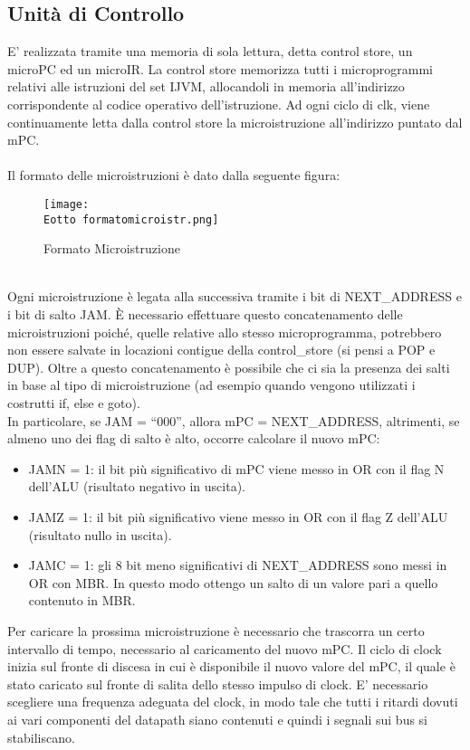 \documentclass[12pt]{article}
\def \Eotto {Allegati/Esercizio8/}
\begin{document}
\subsection{Unità di Controllo}
E’ realizzata tramite una memoria di sola lettura, detta control store, un microPC ed un microIR. La control store memorizza tutti i microprogrammi relativi alle istruzioni del set IJVM, allocandoli in memoria all’indirizzo corrispondente al codice operativo dell’istruzione.
Ad ogni ciclo di clk, viene continuamente letta dalla control store la microistruzione all’indirizzo puntato dal mPC.
\\\\Il formato delle microistruzioni è dato dalla seguente figura:
\begin{figure}[ht!]
    \centering
    \texttt{[image: \\Eotto formatomicroistr.png]}
    \caption{Formato Microistruzione}
\end{figure}
\\Ogni microistruzione è legata alla successiva tramite i bit di NEXT\_ADDRESS e i bit di salto JAM. È necessario effettuare questo concatenamento delle microistruzioni poiché, quelle relative allo stesso microprogramma, potrebbero non essere salvate in locazioni contigue della control\_store (si pensi a POP e DUP). Oltre a questo concatenamento è possibile che ci sia la presenza dei salti in base al tipo di microistruzione (ad esempio quando vengono utilizzati i costrutti if, else e goto).
\\In particolare, se JAM = “000”, allora mPC = NEXT\_ADDRESS, altrimenti, se almeno uno dei flag di salto è alto, occorre calcolare il nuovo mPC:
\begin{itemize}
    \item JAMN = 1: il bit più significativo di mPC viene messo in OR  con il flag N dell’ALU (risultato negativo in uscita).
    \item JAMZ = 1: il bit più significativo viene messo in OR con il flag Z dell’ALU (risultato nullo in uscita).
    \item JAMC = 1: gli 8 bit meno significativi di NEXT\_ADDRESS sono messi in OR con MBR. In questo modo ottengo un salto di un valore pari a quello contenuto in MBR.
\end{itemize}
Per caricare la prossima microistruzione è necessario che trascorra un certo intervallo di tempo, necessario al caricamento del nuovo mPC. Il ciclo di clock inizia sul fronte di discesa in cui è disponibile il nuovo valore del mPC, il quale è stato caricato sul fronte di salita dello stesso impulso di clock. E’ necessario scegliere una frequenza adeguata del clock, in modo tale che tutti i ritardi dovuti ai vari componenti del datapath siano contenuti e quindi i segnali sui bus si stabiliscano.
\end{document}

